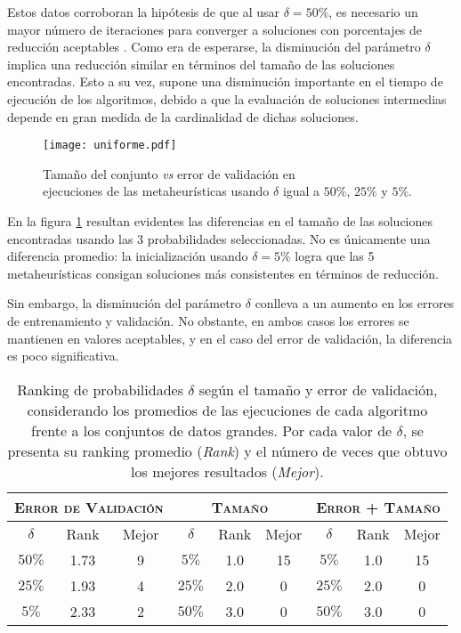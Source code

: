 Estos datos corroboran la hipótesis de que al usar $\delta = 50\%$, es necesario un mayor número de iteraciones para converger a soluciones con porcentajes de reducción aceptables \cite{cano2003using}. Como era de esperarse, la disminución del parámetro $\delta$ implica una reducción similar en términos del tamaño de las soluciones encontradas. Esto a su vez, supone una disminución importante en el tiempo de ejecución de los algoritmos, debido a que la evaluación de soluciones intermedias depende en gran medida de la cardinalidad de dichas soluciones.

\begin{figure}[h!]
\centering
\texttt{[image: uniforme.pdf]}
\caption[Tamaño \emph{vs} error de validación modificando $\delta$]{Tamaño del conjunto \emph{vs} error de validación en\\ejecuciones de las metaheurísticas usando $\delta$ igual a $50\%$, $25\%$ y $5\%$.}
\label{fig-unif}
\end{figure}

En la figura \ref{fig-unif} resultan evidentes las diferencias en el tamaño de las soluciones encontradas usando las 3 probabilidades seleccionadas. No es únicamente una diferencia promedio: la inicialización usando $\delta = 5\%$ logra que las 5 metaheurísticas consigan soluciones más consistentes en términos de reducción.

Sin embargo, la disminución del parámetro $\delta$ conlleva a un aumento en los errores de entrenamiento y validación. No obstante, en ambos casos los errores se mantienen en valores aceptables, y en el caso del error de validación, la diferencia es poco significativa.

\begin{table}[h!]
\centering
\begin{tabular}{c c c|c c c|c c c}
\hline
\multicolumn{3}{c|}{\textsc{Error de Validación}}
	& \multicolumn{3}{c|}{\textsc{Tamaño}}
	& \multicolumn{3}{c}{\textsc{Error + Tamaño}} \\
\hline
$\delta$ & Rank & Mejor & $\delta$ & Rank & Mejor & $\delta$ & Rank & Mejor \\
\hline
\hline
$50\%$ & 1.73 & 9 & $5\%$  & 1.0 & 15 & $5\%$  & 1.0 & 15 \\
$25\%$ & 1.93 & 4 & $25\%$ & 2.0 &  0 & $25\%$ & 2.0 &  0 \\
$5\%$  & 2.33 & 2 & $50\%$ & 3.0 &  0 & $50\%$ & 3.0 &  0 \\
\hline
\end{tabular}
\caption[Ranking de valores probabilidad de aparición de bit $\delta$]{Ranking de probabilidades $\delta$ según el tamaño y error de validación, considerando los promedios de las ejecuciones de cada algoritmo frente a los conjuntos de datos grandes. Por cada valor de $\delta$, se presenta su ranking promedio (\emph{Rank}) y el número de veces que obtuvo los mejores resultados (\emph{Mejor}).}
\label{table-unif-rank}
\end{table}

